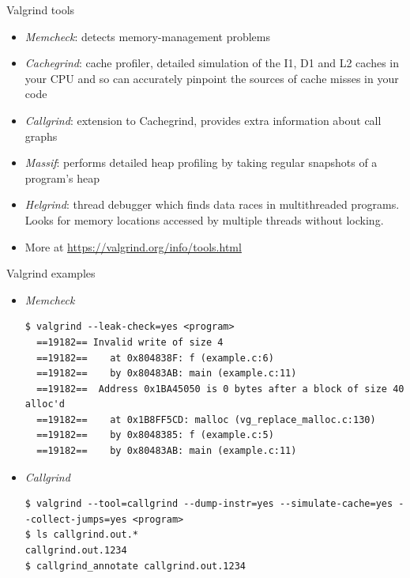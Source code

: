 \begin{frame}{Valgrind tools}
  \begin{itemize}
  \item {\em Memcheck}: detects memory-management problems
  \item {\em Cachegrind}: cache profiler, detailed simulation of the
    I1, D1 and L2 caches in your CPU and so can accurately pinpoint
    the sources of cache misses in your code
  \item {\em Callgrind}: extension to Cachegrind, provides extra
    information about call graphs
  \item {\em Massif}: performs detailed heap profiling by taking
    regular snapshots of a program's heap
  \item {\em Helgrind}: thread debugger which finds data races in
    multithreaded programs. Looks for memory locations accessed by
    multiple threads without locking.
  \item More at \url{https://valgrind.org/info/tools.html}
  \end{itemize}
\end{frame}

\begin{frame}[fragile]{Valgrind examples}
  \begin{itemize}
  \item {\em Memcheck}
    \begin{block}{}
      {\tiny
\begin{verbatim}
$ valgrind --leak-check=yes <program>
  ==19182== Invalid write of size 4
  ==19182==    at 0x804838F: f (example.c:6)
  ==19182==    by 0x80483AB: main (example.c:11)
  ==19182==  Address 0x1BA45050 is 0 bytes after a block of size 40 alloc'd
  ==19182==    at 0x1B8FF5CD: malloc (vg_replace_malloc.c:130)
  ==19182==    by 0x8048385: f (example.c:5)
  ==19182==    by 0x80483AB: main (example.c:11)
\end{verbatim}
      }
    \end{block}

  \item {\em Callgrind}
    \begin{block}{}
      {\tiny
\begin{verbatim}
$ valgrind --tool=callgrind --dump-instr=yes --simulate-cache=yes --collect-jumps=yes <program>
$ ls callgrind.out.*
callgrind.out.1234
$ callgrind_annotate callgrind.out.1234
\end{verbatim}
      }
    \end{block}
  \end{itemize}
\end{frame}

